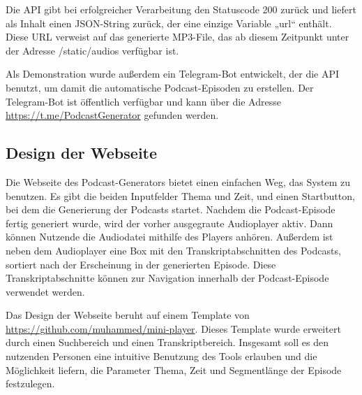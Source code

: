Die API gibt bei erfolgreicher Verarbeitung den Statuscode 200 zurück und liefert als Inhalt einen JSON-String zurück, der eine einzige Variable „url“ enthält.
Diese URL verweist auf das generierte MP3-File, das ab diesem Zeitpunkt unter der Adresse /static/audios verfügbar ist.

Als Demonstration wurde außerdem ein Telegram-Bot entwickelt, der die API benutzt, um damit die automatische Podcast-Episoden zu erstellen.
Der Telegram-Bot ist öffentlich verfügbar und kann über die Adresse \url{https://t.me/PodcastGenerator} gefunden werden.

\subsection{Design der Webseite}

Die Webseite des Podcast-Generators bietet einen einfachen Weg, das System zu benutzen.
Es gibt die beiden Inputfelder Thema und Zeit, und einen Startbutton, bei dem die Generierung der Podcasts startet.
Nachdem die Podcast-Episode fertig generiert wurde, wird der vorher ausgegraute Audioplayer aktiv.
Dann können Nutzende die Audiodatei mithilfe des Players anhören.
Außerdem ist neben dem Audioplayer eine Box mit den Transkriptabschnitten des Podcasts, sortiert nach der Erscheinung in der generierten Episode.
Diese Transkriptabschnitte können zur Navigation innerhalb der Podcast-Episode verwendet werden.

Das Design der Webseite beruht auf einem Template von \url{https://github.com/muhammed/mini-player}.
Dieses Template wurde erweitert durch einen Suchbereich und einen Transkriptbereich.
Insgesamt soll es den nutzenden Personen eine intuitive Benutzung des Tools erlauben und die Möglichkeit liefern, die Parameter Thema, Zeit und Segmentlänge der Episode festzulegen.

